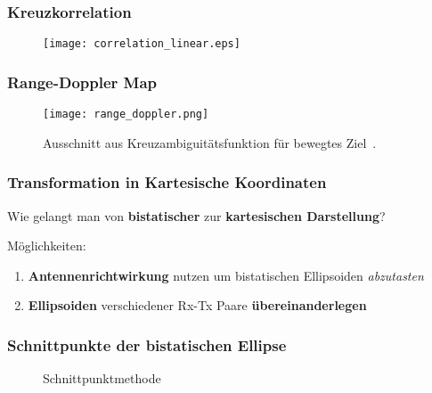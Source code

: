 \begin{frame}
    \frametitle{Kreuzkorrelation}

    \begin{figure}
        \centering
        \texttt{[image: correlation\_linear.eps]}
    \end{figure}
\end{frame}

\begin{frame}
    \frametitle{Range-Doppler Map}

    \begin{figure}
        \centering
        \texttt{[image: range\_doppler.png]}
        \caption{Ausschnitt aus Kreuzambiguitätsfunktion für bewegtes Ziel~\cite[p.~161]{Malanowski2019}.}
    \end{figure}
\end{frame}

\begin{frame}
    \frametitle{Transformation in Kartesische Koordinaten}

    \Large Wie gelangt man von \textbf{bistatischer} zur \textbf{kartesischen Darstellung}?\normalsize

    \vspace{2\baselineskip}

    Möglichkeiten:
    \begin{enumerate}
        \item \textbf{Antennenrichtwirkung} nutzen um bistatischen Ellipsoiden \emph{abzutasten}
        \item \textbf{Ellipsoiden} verschiedener Rx-Tx Paare \textbf{übereinanderlegen}
    \end{enumerate}
\end{frame}

\begin{frame}
    \frametitle{Schnittpunkte der bistatischen Ellipse}

    \begin{figure}
        \centering
        \begin{adjustbox}{max width=\linewidth,totalheight=\baselineskip}
            \begin{tikzpicture}
                
            \end{tikzpicture}
        \end{adjustbox}
        \caption{Schnittpunktmethode}
    \end{figure}
\end{frame}
